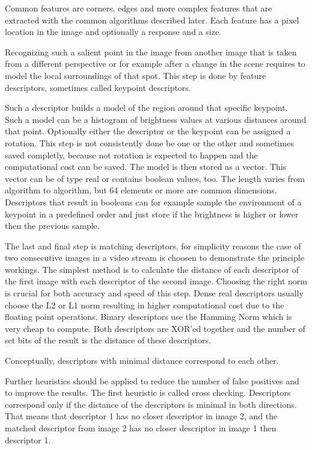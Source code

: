 Common features are corners, edges and more complex features that are extracted with the common algorithms described later.
Each feature has a pixel location in the image and optionally a response and a size.

Recognizing such a salient point in the image from another image that is taken from a different perspective or for example after a change in the scene requires to model the local surroundings of that spot.
This step is done by feature descriptors, sometimes called keypoint descriptors.

Such a descriptor builds a model of the region around that specific keypoint.
Such a model can be a histogram of brightness values at various distances around that point.
Optionally either the descriptor or the keypoint can be assigned a rotation.
This step is not consistently done be one or the other and sometimes saved completly, because not rotation is expected to happen and the computational cost can be saved.
The model is then stored as a vector.
This vector can be of type real or contains boolean values, too.
The length varies from algorithm to algorithm, but 64 elements or more are common dimensions.
Descriptors that result in booleans can for example sample the environment of a keypoint in a predefined order and just store if the brightness is higher or lower then the previous sample.

The last and final step is matching descriptors, for simplicity reasons the case of two consecutive images in a video stream is choosen to demonstrate the principle workings.
The simplest method is to calculate the distance of each descriptor of the first image with each descriptor of the second image.
Choosing the right norm is crucial for both accuracy and speed of this step.
Dense real descriptors usually choose the L2 or L1 norm resulting in higher computational cost due to the floating point operations.
Binary descriptors use the Hamming Norm which is very cheap to compute.
Both descriptors are XOR'ed together and the number of set bits of the result is the distance of these descriptors.

Conceptually, descriptors with minimal distance correspond to each other.

Further heuristics should be applied to reduce the number of false positives and to improve the results.
The first heuristic is called cross checking. Descriptors correspond only if the distance of the descriptors is minimal in both directions.
That means that descriptor 1 has no closer descriptor in image 2, and the matched descriptor from image 2 has no closer descriptor in image 1 then descriptor 1.

